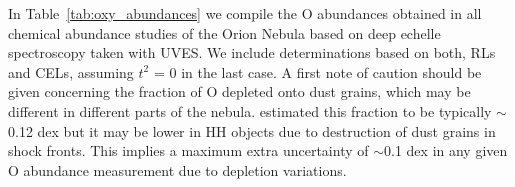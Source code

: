 \documentclass[twocolumn,linenumbers]{aastex63}
\newcommand{\cesar}[1]{{\color{red}C: #1}}
\begin{document}



In Table~\ref{tab:oxy_abundances} we compile the O abundances obtained in all chemical abundance studies of the Orion Nebula based on deep echelle spectroscopy taken with UVES. We include determinations based on both, RLs and CELs, assuming $t^2$ = 0 in the last case. 
A first note of caution should be given concerning the fraction of O depleted onto dust grains,
which may be different in different parts of the nebula. 
\citet{mesadelgado09} estimated this fraction to be typically $\sim$ 0.12 dex but it may be lower in HH objects due to destruction of dust grains in shock fronts. 
This implies a maximum extra uncertainty of $\sim$0.1 dex in any given O abundance measurement due to depletion variations.
\end{document}
